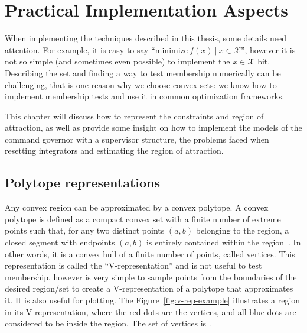
\chapter{Practical Implementation Aspects}%
\label{chp:practival-implementation-aspects}

When implementing the techniques described in this thesis, some details need
attention. For example, it is easy to say
\enquote{\(\mathrm{minimize}~f(x)~|~x\in\mathcal{X}\)}, however it is not so
simple (and sometimes even possible) to implement the \(x\in\mathcal{X}\) bit.
Describing the set and finding a way to test membership numerically can be
challenging, that is one reason why we choose convex sets: we know how to
implement membership tests and use it in common optimization frameworks.

This chapter will discuss how to represent the constraints and region of
attraction, as well as provide some insight on how to implement the models of
the command governor with a supervisor structure, the problems faced when
resetting integrators and estimating the region of attraction.

\section{Polytope representations}%
\label{sec:polytope-representation}

Any convex region can be approximated by a convex polytope. A convex polytope is
defined as a compact convex set with a finite number of extreme points such
that, for any two distinct points \((a,b)\) belonging to the region, a closed
segment with endpoints \((a,b)\) is entirely contained within the
region~\parencite{grünbaum:convex}. In other words, it is a convex hull of a
finite number of points, called vertices. This representation is called the
\enquote{V-representation} and is not useful to test membership, however is very
simple to sample points from the boundaries of the desired region/set to create
a V-representation of a polytope that approximates it. It is also useful for
plotting. The Figure~\ref{fig:v-rep-example} illustrates a region in its
V-representation, where the red dots are the vertices, and all blue dots are
considered to be inside the region. The set of vertices is
.

